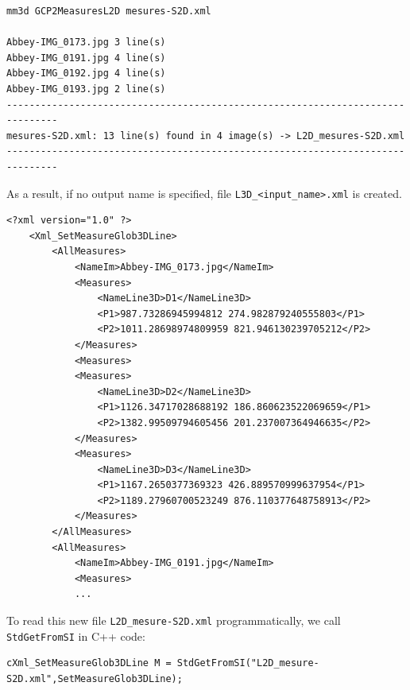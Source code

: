 \begin{verbatim}
mm3d GCP2MeasuresL2D mesures-S2D.xml 

Abbey-IMG_0173.jpg 3 line(s)
Abbey-IMG_0191.jpg 4 line(s)
Abbey-IMG_0192.jpg 4 line(s)
Abbey-IMG_0193.jpg 2 line(s)
-------------------------------------------------------------------------------
mesures-S2D.xml: 13 line(s) found in 4 image(s) -> L2D_mesures-S2D.xml
-------------------------------------------------------------------------------
\end{verbatim}

\noindent As a result, if no output name is specified, file \texttt{L3D\_<input\_name>.xml} is created.\newline

{\scriptsize
\begin{verbatim}
<?xml version="1.0" ?>
    <Xml_SetMeasureGlob3DLine>
        <AllMeasures>
            <NameIm>Abbey-IMG_0173.jpg</NameIm>
            <Measures>
                <NameLine3D>D1</NameLine3D>
                <P1>987.73286945994812 274.982879240555803</P1>
                <P2>1011.28698974809959 821.946130239705212</P2>
            </Measures>
            <Measures>
            <Measures>
                <NameLine3D>D2</NameLine3D>
                <P1>1126.34717028688192 186.860623522069659</P1>
                <P2>1382.99509794605456 201.237007364946635</P2>
            </Measures>
            <Measures>
                <NameLine3D>D3</NameLine3D>
                <P1>1167.2650377369323 426.889570999637954</P1>
                <P2>1189.27960700523249 876.110377648758913</P2>
            </Measures>
        </AllMeasures>
        <AllMeasures>
            <NameIm>Abbey-IMG_0191.jpg</NameIm>
            <Measures>
            ...
\end{verbatim}
}

\noindent To read this new file \texttt{L2D\_mesure-S2D.xml} programmatically, we call \texttt{StdGetFromSI} in C++ code: \newline


\begin{verbatim}
cXml_SetMeasureGlob3DLine M = StdGetFromSI("L2D_mesure-S2D.xml",SetMeasureGlob3DLine);
\end{verbatim}

